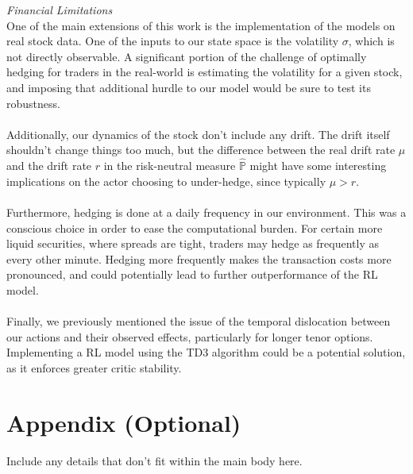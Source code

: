 \documentclass{article}
\begin{document}
\textit{Financial Limitations}\\
One of the main extensions of this work is the implementation of the models on real stock data. One of the inputs to our state space is the volatility $\sigma$, which is not directly observable. A significant portion of the challenge of optimally hedging for traders in the real-world is estimating the volatility for a given stock, and imposing that additional hurdle to our model would be sure to test its robustness.\\\\
Additionally, our dynamics of the stock don't include any drift. The drift itself shouldn't change things too much, but the difference between the real drift rate $\mu$ and the drift rate $r$ in the risk-neutral measure $\hat{\mathbb{P}}$ might have some interesting implications on the actor choosing to under-hedge, since typically $\mu > r$.\\\\
Furthermore, hedging is done at a daily frequency in our environment. This was a conscious choice in order to ease the computational burden. For certain more liquid securities, where spreads are tight, traders may hedge as frequently as every other minute. Hedging more frequently makes the transaction costs more pronounced, and could potentially lead to further outperformance of the RL model.\\\\
Finally, we previously mentioned the issue of the temporal dislocation between our actions and their observed effects, particularly for longer tenor options. Implementing a RL model using the TD3 algorithm could be a potential solution, as it enforces greater critic stability.

{\footnotesize



}

\section{Appendix (Optional)}

Include any details that don't fit within the main body here.
\end{document}
